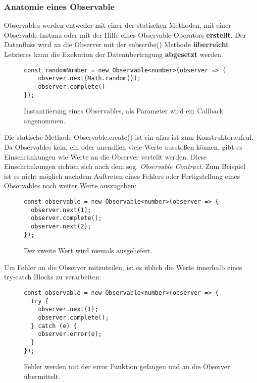 \subsubsection{Anatomie eines Observable}
Observables werden entweder mit einer der statischen Methoden, mit einer Observable Instanz oder mit der Hilfe eines Observable-Operators \textbf{erstellt}. Der Datenfluss wird an die Observer mit der subscribe() Methode \textbf{überreicht}. Letzteres kann die Exekution der Datenübertragung \textbf{abgesetzt} werden.

\begin{figure}[H]
\begin{lstlisting}[basicstyle=\small]
const randomNumber = new Observable<number>(observer => {
    observer.next(Math.random());
    observer.complete()
});
\end{lstlisting}
\caption{Instantiierung eines Observables, als Parameter wird ein Callback angenommen.}
\end{figure}

\noindent
Die statische Methode Observable.create() ist ein alias ist zum Konstruktoraufruf. Da Observables kein, ein oder unendlich viele Werte ausstoßen können, gibt es Einschränkungen wie Werte an die Observer verteilt werden. Diese Einschränkungen richten sich nach dem sog. \textit{Observable Contract}. Zum Beispiel ist es nicht möglich nachdem Auftreten eines Fehlers oder Fertigstellung eines Observables noch weiter Werte auszugeben:

\begin{figure}[H]
\begin{lstlisting}[basicstyle=\small]
const observable = new Observable<number>(observer => {
  observer.next(1);
  observer.complete();
  observer.next(2);
});
\end{lstlisting}
\caption{Der zweite Wert wird niemals ausgeliefert.}
\end{figure}

\noindent
Um Fehler an die Observer mitzuteilen, ist es üblich die Werte innerhalb eines try-catch Blocks zu verarbeiten:

\begin{figure}[H]
\begin{lstlisting}[basicstyle=\small]
const observable = new Observable<number>(observer => {
  try {
    observer.next(1);
    observer.complete();
  } catch (e) {
    observer.error(e);
  }
});
\end{lstlisting}
\caption{Fehler werden mit der error Funktion gefangen und an die Observer übermittelt.}
\label{catch-error-obs}
\end{figure}

